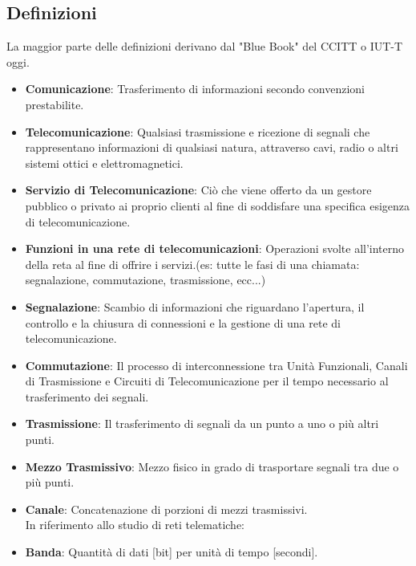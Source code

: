 \documentclass[12pt]{article}
\begin{document}
\subsection{Definizioni}
La maggior parte delle definizioni derivano dal "Blue Book" del CCITT o IUT-T oggi.
\begin{itemize}
  \item \textbf{Comunicazione}: Trasferimento di informazioni secondo convenzioni prestabilite.\\
  \item \textbf{Telecomunicazione}: Qualsiasi trasmissione e ricezione di segnali che rappresentano informazioni di qualsiasi natura, attraverso cavi, radio o altri sistemi ottici e elettromagnetici.\\
  \item \textbf{Servizio di Telecomunicazione}: Ciò che viene offerto da un gestore pubblico o privato ai proprio clienti al fine di soddisfare una specifica esigenza di telecomunicazione.\\
  \item \textbf{Funzioni in una rete di telecomunicazioni}: Operazioni svolte all'interno della reta al fine di offrire i servizi.(es: tutte le fasi di una chiamata: segnalazione, commutazione, trasmissione, ecc...)\\
  \item \textbf{Segnalazione}: Scambio di informazioni che riguardano l'apertura, il controllo e la chiusura di connessioni e la gestione di una rete di telecomunicazione.\\
  \item \textbf{Commutazione}: Il processo di interconnessione tra Unità Funzionali, Canali di Trasmissione e Circuiti di Telecomunicazione per il tempo necessario al trasferimento dei segnali.\\
  \item \textbf{Trasmissione}: Il trasferimento di segnali da un punto a uno o più altri punti.\\
  \item \textbf{Mezzo Trasmissivo}: Mezzo fisico in grado di trasportare segnali tra due o più punti.\\
  \item \textbf{Canale}: Concatenazione di porzioni di mezzi trasmissivi.\\
  In riferimento allo studio di reti telematiche:\\
  \item \textbf{Banda}: Quantità di dati [bit] per unità di tempo [secondi].\\

\end{itemize}
\end{document}
